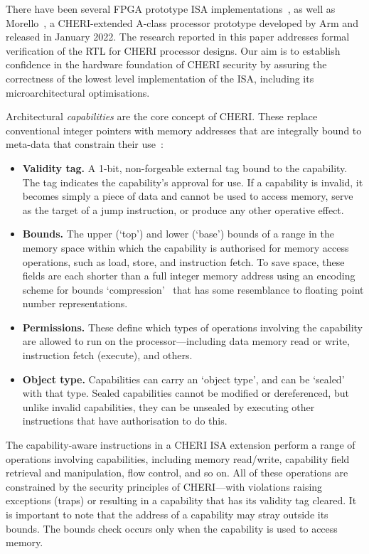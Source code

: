 \documentclass[10pt,conference]{IEEEtran}
\begin{document}
There have been several FPGA prototype ISA implementations~\cite{Picollo,
  Flute, Toooba}, as well as Morello~\cite{ArmMorello, Morello}, a
CHERI-extended A-class processor prototype developed by Arm and released in
January 2022.  The research reported in this paper addresses formal
verification of the RTL for CHERI processor designs. Our aim is to
establish confidence in the hardware foundation of CHERI security by
assuring the correctness of the lowest level implementation of the ISA,
including its microarchitectural optimisations.

Architectural \textit{capabilities} are the core concept of CHERI.  These
replace conventional integer pointers with memory addresses that are
integrally bound to meta-data that constrain their use~\cite{cheriot-sail, cheri-risc-v}:

\smallskip

\begin{itemize}
	\item \textbf{Validity tag.} A 1-bit, non-forgeable external tag
    bound to the capability. The tag indicates the capability’s
    approval for use. If a capability is invalid, it becomes simply a
    piece of data and cannot be used to access memory, serve as the
    target of a jump instruction, or produce any other operative
    effect.
  \item \textbf{Bounds.} The upper (`top') and lower (`base') bounds
    of a range in the memory space within which the capability is
    authorised for memory access operations, such as load, store, and
    instruction fetch. To save space, these fields are each shorter than a full integer
    memory address using an encoding scheme for bounds `compression'~\cite{CHERIConcentrate}
    that has some resemblance to floating point number
    representations.
  \item \textbf{Permissions.}  These define which types of operations
    involving the capability are allowed to run on the processor---including data
    memory read or write, instruction fetch (execute), and others.
  \item \textbf{Object type.}  Capabilities can carry an `object type', and can be `sealed' with that
  type. Sealed capabilities cannot be modified or dereferenced, but unlike
  invalid capabilities, they can be unsealed by executing other instructions
  that have authorisation to do this.
\end{itemize}

\smallskip

The capability-aware instructions in a CHERI ISA extension perform a range
of operations involving capabilities, including memory read/write,
capability field retrieval and manipulation, flow control, and so on. All
of these operations are constrained by the security principles of
CHERI---with violations raising exceptions (traps) or resulting in a
capability that has its validity tag cleared. It is important to note that
the address of a capability may stray outside its bounds. The bounds check
occurs only when the capability is used to access memory.
\end{document}
